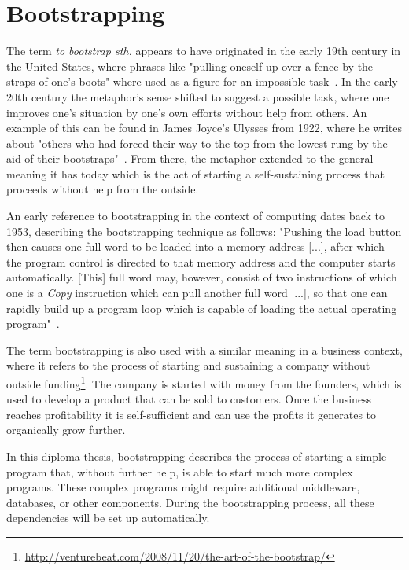 \section{Bootstrapping}
\label{fundamentals:bootstrapping}

The term \textit{to bootstrap sth.} appears to have originated in the early 19th century in the United States, where phrases like "pulling oneself up over a fence by the straps of one's boots" where used as a figure for an impossible task~\autocite{bootstrap:history}.
In the early 20th century the metaphor's sense shifted to suggest a possible task, where one improves one's situation by one's own efforts without help from others.
An example of this can be found in James Joyce's Ulysses from 1922, where he writes about "others who had forced their way to the top from the lowest rung by the aid of their bootstraps"~\autocite{bootstrap:ulysses}.
From there, the metaphor extended to the general meaning it has today which is the act of starting a self-sustaining process that proceeds without help from the outside.

An early reference to bootstrapping in the context of computing dates back to 1953, describing the bootstrapping technique as follows: "Pushing the load button then causes one full word to be loaded into a memory address [...], after which the program control is directed to that memory address and the computer starts automatically. [This] full word may, however, consist of two instructions of which one is a \textit{Copy} instruction which can pull another full word [...], so that one can rapidly build up a program loop which is capable of loading the actual operating program"~\autocite{bootstrap:early}.

\pagebreak

The term bootstrapping is also used with a similar meaning in a business context, where it refers to the process of starting and sustaining a company without outside funding\footnote{\url{http://venturebeat.com/2008/11/20/the-art-of-the-bootstrap/}}.
The company is started with money from the founders, which is used to develop a product that can be sold to customers.
Once the business reaches profitability it is self-sufficient and can use the profits it generates to organically grow further.

In this diploma thesis, bootstrapping describes the process of starting a simple program that, without further help, is able to start much more complex programs.
These complex programs might require additional middleware, databases, or other components.
During the bootstrapping process, all these dependencies will be set up automatically.
